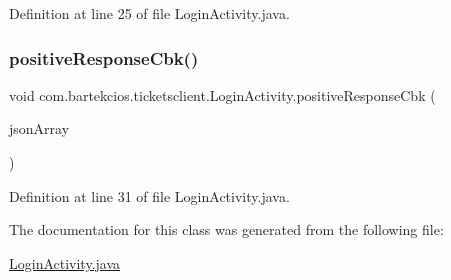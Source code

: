 Definition at line 25 of file Login\+Activity.\+java.

\mbox{\label{classcom_1_1bartekcios_1_1ticketsclient_1_1_login_activity_a0d61bd01e94ea4593cd584a3950b8249}} 
\subsubsection{\texorpdfstring{positive\+Response\+Cbk()}{positiveResponseCbk()}}
{\footnotesize\ttfamily void com.\+bartekcios.\+ticketsclient.\+Login\+Activity.\+positive\+Response\+Cbk (\begin{DoxyParamCaption}\item[{J\+S\+O\+N\+Array}]{json\+Array }\end{DoxyParamCaption})}



Definition at line 31 of file Login\+Activity.\+java.



The documentation for this class was generated from the following file\+:\begin{DoxyCompactItemize}
\item 
\hyperlink{_login_activity_8java}{Login\+Activity.\+java}\end{DoxyCompactItemize}
